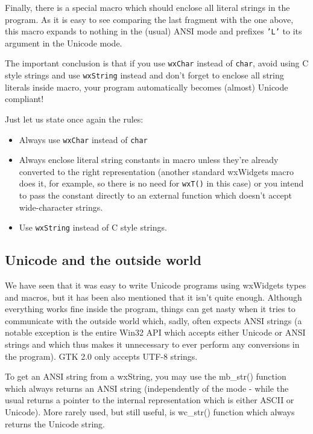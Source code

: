 Finally, there is a special  macro which should enclose all
literal strings in the program. As it is easy to see comparing the last
fragment with the one above, this macro expands to nothing in the (usual) ANSI
mode and prefixes {\tt 'L'} to its argument in the Unicode mode.

The important conclusion is that if you use {\tt wxChar} instead of 
{\tt char}, avoid using C style strings and use {\tt wxString} instead and
don't forget to enclose all string literals inside  macro, your
program automatically becomes (almost) Unicode compliant!

Just let us state once again the rules:

\begin{itemize}
\item Always use {\tt wxChar} instead of {\tt char}
\item Always enclose literal string constants in  macro
unless they're already converted to the right representation (another standard
wxWidgets macro  does it, for example, so there is no
need for {\tt wxT()} in this case) or you intend to pass the constant directly
to an external function which doesn't accept wide-character strings.
\item Use {\tt wxString} instead of C style strings.
\end{itemize}

\subsection{Unicode and the outside world}\label{unicodeoutsidewxw}

We have seen that it was easy to write Unicode programs using wxWidgets types
and macros, but it has been also mentioned that it isn't quite enough.
Although everything works fine inside the program, things can get nasty when
it tries to communicate with the outside world which, sadly, often expects
ANSI strings (a notable exception is the entire Win32 API which accepts either
Unicode or ANSI strings and which thus makes it unnecessary to ever perform
any conversions in the program). GTK 2.0 only accepts UTF-8 strings.

To get an ANSI string from a wxString, you may use the 
mb\_str() function which always returns an ANSI
string (independently of the mode - while the usual 
 returns a pointer to the internal
representation which is either ASCII or Unicode). More rarely used, but still
useful, is wc\_str() function which always returns
the Unicode string.

